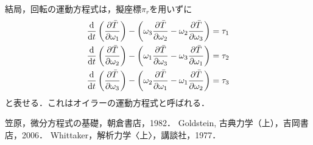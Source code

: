 \documentclass[a4j,10pt]{jsarticle}
\newcommand{\bbn}[2]{\frac{{\rm {\rm d}} #1}{{\rm {\rm d}} #2}}
\newcommand{\henbbn}[2]{\frac{\partial #1}{\partial #2}}
\begin{document}
結局，回転の運動方程式は，擬座標$\pi_r$を用いずに
\begin{subequations}
    \begin{align}
        \bbn{}{t}\left(\henbbn{\bar{T}}{\omega_1}\right) - \left(\omega_3\henbbn{\bar{T}}{\omega_2}- \omega_2\henbbn{\bar{T}}{\omega_3}\right) = \tau_1\\
        \bbn{}{t}\left(\henbbn{\bar{T}}{\omega_2}\right) - \left(\omega_1\henbbn{\bar{T}}{\omega_3}- \omega_3\henbbn{\bar{T}}{\omega_1}\right) = \tau_2\\
        \bbn{}{t}\left(\henbbn{\bar{T}}{\omega_3}\right) - \left(\omega_2\henbbn{\bar{T}}{\omega_1}- \omega_1\henbbn{\bar{T}}{\omega_2}\right) = \tau_3
    \end{align}
\end{subequations}
と表せる．これはオイラーの運動方程式と呼ばれる．

\begin{thebibliography}{9}
     笠原，微分方程式の基礎，朝倉書店，1982．
     Goldstein, 古典力学（上），吉岡書店，2006．
     Whittaker，解析力学〈上〉，講談社，1977．
\end{thebibliography}
\end{document}
